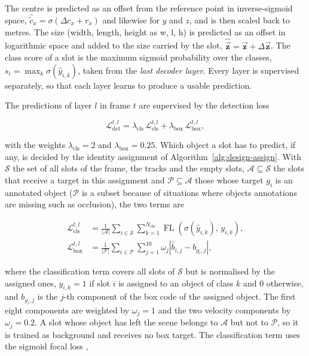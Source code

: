 The centre is predicted as an offset from the reference point in inverse-sigmoid space,
$\hat{\tilde{c}}_x = \sigma(\Delta c_x + r_x)$ and likewise for $y$ and $z$, and is then scaled back to
metres. The size (width, length, height as w, l, h) is predicted as an offset in logarithmic space and added to the size carried by the slot,
$\hat{\vec{\mathbf{z}}} = \vec{\mathbf{z}} + \Delta \vec{\mathbf{z}}$. The class score of a slot is the maximum sigmoid
probability over the classes, $s_i = \max_k \sigma(\hat{y}_{i,k})$, taken from the \emph{last decoder layer}. Every
layer is supervised separately, so that each layer learns to produce a usable prediction.

The predictions of layer $l$ in frame $t$ are supervised by the detection loss

\begin{equation}
    \mathcal{L}_{\mathrm{det}}^{t,l} = \lambda_{\mathrm{cls}}\, \mathcal{L}_{\mathrm{cls}}^{t,l} +
    \lambda_{\mathrm{box}}\, \mathcal{L}_{\mathrm{box}}^{t,l},
    \label{eq:design-detloss}
\end{equation}

with the weights $\lambda_{\mathrm{cls}} = 2$ and $\lambda_{\mathrm{box}} = 0.25$. Which object a slot has to
predict, if any, is decided by the identity assignment of Algorithm~\ref{alg:design-assign}. With
$\mathcal{S}$ the set of all slots of the frame, the tracks and the empty slots, $\mathcal{A} \subseteq \mathcal{S}$
the slots that receive a target in this assignment and $\mathcal{P} \subseteq \mathcal{A}$
those whose target $g_i$ is an annotated object ($\mathcal{P}$ is a subset because of situations where objects annotations are missing such as occlusion), the two terms are

\begin{equation}
    \begin{aligned}
        \mathcal{L}_{\mathrm{cls}}^{t,l} &= \frac{1}{\lvert \mathcal{A} \rvert} \sum_{i \in \mathcal{S}}
        \sum_{k=1}^{N_{\mathrm{cls}}} \operatorname{FL}\!\left( \sigma(\hat{y}_{i,k}),\, y_{i,k} \right), \\
        \mathcal{L}_{\mathrm{box}}^{t,l} &= \frac{1}{\lvert \mathcal{P} \rvert} \sum_{i \in \mathcal{P}}
        \sum_{j=1}^{10} \omega_j \left\lvert \hat{b}_{i,j} - b_{g_i,j} \right\rvert,
    \end{aligned}
    \label{eq:design-detterms}
\end{equation}

where the classification term covers all slots of $\mathcal{S}$ but is normalised by the assigned ones,
$y_{i,k} = 1$ if slot $i$ is assigned to an object of
class $k$ and $0$ otherwise, and $b_{g_i,j}$ is the $j$-th component of the box code of the assigned object.
The first eight components are weighted by $\omega_j = 1$ and the two velocity components by
$\omega_j = 0.2$. A slot whose object has left the scene belongs to $\mathcal{A}$ but not to $\mathcal{P}$, so it
is trained as background and receives no box target. The classification term uses the sigmoid focal loss
\cite{Lin2017Focal},


